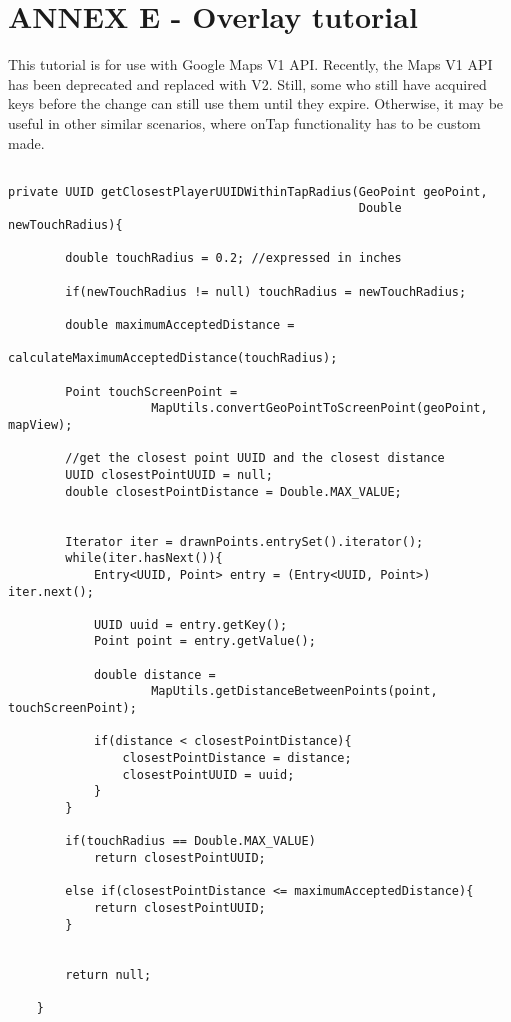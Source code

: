 \section{ANNEX E - Overlay tutorial}

This tutorial is for use with Google Maps V1 API. Recently, the Maps V1 API has
been deprecated and replaced with V2. Still, some who still have acquired keys
before the change can still use them until they expire. Otherwise, it
may be useful in other similar scenarios, where onTap functionality
has to be custom made.\newline
\begin{verbatim}

private UUID getClosestPlayerUUIDWithinTapRadius(GeoPoint geoPoint,
												 Double newTouchRadius){
		
		double touchRadius = 0.2; //expressed in inches
		
		if(newTouchRadius != null) touchRadius = newTouchRadius;		 
				
		double maximumAcceptedDistance = 
								calculateMaximumAcceptedDistance(touchRadius);
		
		Point touchScreenPoint = 
					MapUtils.convertGeoPointToScreenPoint(geoPoint, mapView);
		
		//get the closest point UUID and the closest distance
		UUID closestPointUUID = null;
		double closestPointDistance = Double.MAX_VALUE;
			
		
		Iterator iter = drawnPoints.entrySet().iterator();
		while(iter.hasNext()){			
			Entry<UUID, Point> entry = (Entry<UUID, Point>) iter.next();
			
			UUID uuid = entry.getKey();
			Point point = entry.getValue();
			
			double distance = 
					MapUtils.getDistanceBetweenPoints(point, touchScreenPoint);
			
			if(distance < closestPointDistance){
				closestPointDistance = distance;
				closestPointUUID = uuid;		
			}
		}
		
		if(touchRadius == Double.MAX_VALUE) 
			return closestPointUUID;
		
		else if(closestPointDistance <= maximumAcceptedDistance){
			return closestPointUUID;
		}
		
		
		return null;
		
	}
	
\end{verbatim}
